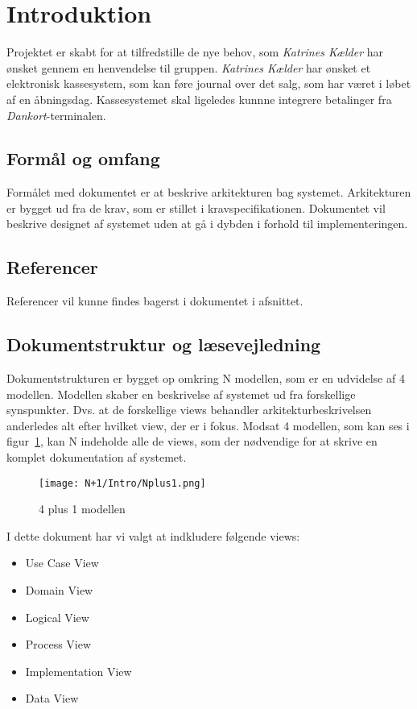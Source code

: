\section{Introduktion}
Projektet er skabt for at tilfredstille de nye behov, som \textit{Katrines Kælder} har ønsket gennem en henvendelse til gruppen. \textit{Katrines Kælder} har ønsket et elektronisk kassesystem, som kan føre journal over det salg, som har været i løbet af en åbningsdag. Kassesystemet skal ligeledes kunnne integrere betalinger fra \textit{Dankort}-terminalen.

\subsection{Formål og omfang}
Formålet med dokumentet er at beskrive arkitekturen bag systemet. Arkitekturen er bygget ud fra de krav, som er stillet i kravspecifikationen. Dokumentet vil beskrive designet af systemet uden at gå i dybden i forhold til implementeringen.

\subsection{Referencer}
Referencer vil kunne findes bagerst i dokumentet i afsnittet.

\subsection{Dokumentstruktur og læsevejledning}
Dokumentstrukturen er bygget op omkring N modellen, som er en udvidelse af 4 modellen. Modellen skaber en beskrivelse af systemet ud fra forskellige synspunkter. Dvs. at de forskellige views behandler arkitekturbeskrivelsen anderledes alt efter hvilket view, der er i fokus. Modsat 4 modellen, som kan ses i figur~\ref{fig:4plus1}, kan N indeholde alle de views, som der nødvendige for at skrive en komplet dokumentation af systemet.

\begin{figure}[H]
	\centering
	\texttt{[image: N+1/Intro/Nplus1.png]}
	\caption{4 plus 1 modellen}
	\label{fig:4plus1}
\end{figure}

I dette dokument har vi valgt at indkludere følgende views:

\begin{itemize}
	\item Use Case View
	\item Domain View
	\item Logical View
	\item Process View
	\item Implementation View
	\item Data View
\end{itemize}

